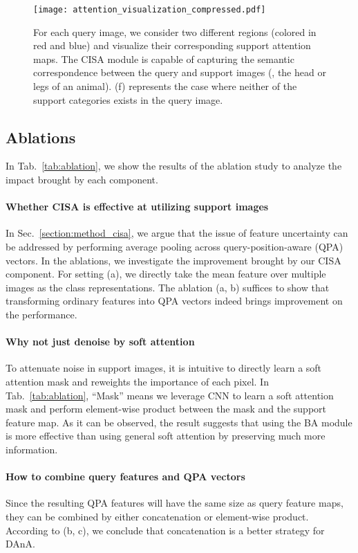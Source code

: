 \documentclass[journal]{IEEEtran}
\begin{document}
\begin{figure*}[h]
    \centering
    \texttt{[image: attention\_visualization\_compressed.pdf]}
    \caption{For each query image, we consider two different regions (colored in red and blue) and visualize their corresponding support attention maps. The CISA module is capable of capturing the semantic correspondence between the query and support images (, the head or legs of an animal). (f) represents the case where neither of the support categories exists in the query image.
    }
    \label{fig:attention_visualization}
\end{figure*} 


\subsection{Ablations}
In Tab.~\ref{tab:ablation}, we show the results of the ablation study to analyze the impact brought by each component.


\paragraph{Whether CISA is effective at utilizing support images}
In Sec.~\ref{section:method_cisa}, we argue that the issue of feature uncertainty can be addressed by performing average pooling across query-position-aware (QPA) vectors.
In the ablations, we investigate the improvement brought by our CISA component.
For setting (a), we directly take the mean feature over multiple images as the class representations.
The ablation (a, b) suffices to show that transforming ordinary features into QPA vectors indeed brings improvement on the performance.


\paragraph{Why not just denoise by soft attention}
To attenuate noise in support images, it is intuitive to directly learn a soft attention mask and reweights the importance of each pixel.
In Tab.~\ref{tab:ablation}, ``Mask'' means we leverage CNN to learn a soft attention mask and perform element-wise product between the mask and the support feature map.
As it can be observed, the result suggests that using the BA module is more effective than using general soft attention by preserving much more information.


\paragraph{How to combine query features and QPA vectors} 
Since the resulting QPA features will have the same size as query feature maps, they can be combined by either concatenation or element-wise product.
According to (b, c), we conclude that concatenation is a better strategy for DAnA.
\end{document}
